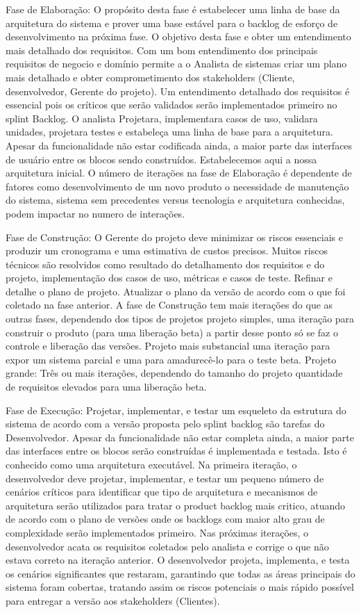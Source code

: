 \documentclass[	DIV=calc,%
							paper=a4,%
							fontsize=12pt,%
							onecolumn]{scrartcl}	 					%
\begin{document}
Fase de Elaboração: O propósito desta fase é estabelecer uma linha de base da arquitetura do sistema e prover uma base estável para o backlog de esforço de desenvolvimento na próxima fase.
O objetivo desta fase e obter um entendimento mais detalhado dos requisitos. Com um bom entendimento dos principais requisitos de negocio e domínio permite a o Analista de sistemas criar um plano mais detalhado e obter comprometimento dos stakeholders (Cliente, desenvolvedor, Gerente do projeto). Um entendimento detalhado dos requisitos é essencial pois os críticos que serão validados serão implementados primeiro no splint Backlog. O analista Projetara, implementara casos de uso, validara unidades, projetara testes e estabeleça uma linha de base para a arquitetura. Apesar da funcionalidade não estar codificada ainda, a maior parte das interfaces de usuário entre os blocos sendo construídos. Estabelecemos aqui a nossa arquitetura inicial.
O número de iterações na fase de Elaboração é dependente de fatores como desenvolvimento de um novo produto o necessidade de manutenção do sistema, sistema sem precedentes versus tecnologia e arquitetura conhecidas, podem impactar no numero de interações. 


Fase de Construção: O Gerente do projeto deve minimizar os riscos essenciais e produzir um cronograma e uma estimativa de custos precisos. Muitos riscos técnicos são resolvidos como resultado do detalhamento dos requisitos e do projeto, implementação dos casos de uso, métricas e casos de teste. Refinar e detalhe o plano de projeto. Atualizar o plano da versão de acordo com o que foi coletado na fase anterior.
A fase de Construção tem mais iterações do que as outras fases, dependendo dos tipos de projetos projeto simples, uma iteração para construir o produto (para uma liberação beta) a partir desse ponto só se faz o controle e liberação das versões. Projeto mais substancial uma iteração para expor um sistema parcial e uma para amadurecê-lo para o teste beta. Projeto grande: Três ou mais iterações, dependendo do tamanho do projeto quantidade de requisitos  elevados para uma liberação beta.


Fase de Execução: Projetar, implementar, e testar um esqueleto da estrutura do sistema de acordo com a versão proposta pelo splint backlog são tarefas do Desenvolvedor. Apesar da funcionalidade não estar completa ainda, a maior parte das interfaces entre os blocos serão construídas é implementada e testada. Isto é conhecido como uma arquitetura executável. Na primeira iteração, o desenvolvedor deve projetar, implementar, e testar um pequeno número de cenários críticos para identificar que tipo de arquitetura e mecanismos de arquitetura serão utilizados para tratar o product backlog mais critico, atuando de acordo com o plano de versões onde os backlogs com maior alto grau de complexidade serão implementados primeiro. 
Nas próximas iterações, o desenvolvedor acata os requisitos coletados pelo analista e corrige o que não estava correto na iteração anterior. O desenvolvedor projeta, implementa, e testa os cenários significantes que restaram, garantindo que todas as áreas principais do sistema foram cobertas, tratando assim os riscos potenciais o mais rápido possível para entregar a versão aos stakeholders (Clientes).
\end{document}

